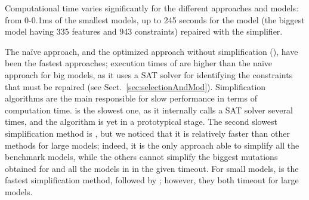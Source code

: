 \begin{tikzborder}{\cite{Gargantini16:validation}}
\begin{tikzborder}{\cite{gargantini_combinatorial_2017}}
\begin{tikzborder}{\cite{gargantini_combinatorial_2017}}
\begin{tikzborder}{\cite{garn2019}}
\begin{tikzborder}{\cite{arcaini2019achieving}}
\begin{tikzborder}{\cite{arcaini2019varivolution}}
		
		
		Computational time varies significantly for the different approaches and models: from 0-0.1ms of the smallest models, up to 245 seconds for the \windows model (the biggest model having 335 features and 943 constraints) repaired with the \espresso simplifier.
		
		The na{\"i}ve approach, and the optimized approach without simplification (\onlySelection), have been the fastest approaches; execution times of \onlySelection are higher than the na{\"i}ve approach for big models, as it uses a SAT solver for identifying the constraints that must be repaired (see Sect.~\ref{sec:selectionAndMod}). Simplification algorithms are the main responsible for slow performance in terms of computation time. \atgt is the slowest one, as it internally calls a SAT solver several times, and the algorithm is yet in a prototypical stage. The second slowest simplification method is \espresso, but we noticed that it is relatively faster than other methods for large models; indeed, it is the only approach able to simplify all the benchmark models, while the others cannot simplify the biggest mutations obtained for \tightVnc and all the models in \benchReal in the given timeout. For small models, \jbool is the fastest simplification method, followed by \qm; however, they both timeout for large models.
		
		
		

\end{tikzborder}
\end{tikzborder}
\end{tikzborder}
\end{tikzborder}
\end{tikzborder}
\end{tikzborder}
